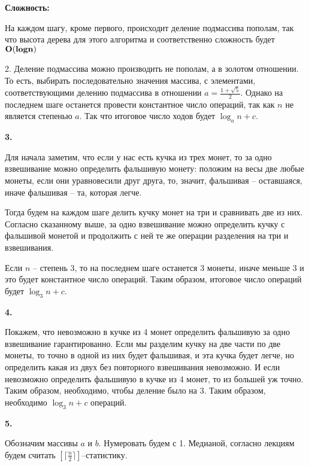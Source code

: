 \documentclass[12pt]{extreport}
\begin{document}
\bigskip 
{\bf Сложность:} 

На каждом шагу, кроме первого, происходит деление подмассива пополам, так что высота дерева для этого алгоритма и соответственно сложность будет $\bf{O(log n)}$

\bigskip 

2. Деление подмассива можно производить не пополам, а в золотом отношении. То есть, выбирать последовательно значения массива, с элементами, соответствующими делению подмассива в отношении $a=\frac{1 + \sqrt{5}}{2}$. Однако на последнем шаге останется провести константное число операций, так как $n$ не является степенью $a$. Так что итоговое число ходов будет $\log_{a}{n} + c$.

\bigskip 

{\bf 3.} 

Для начала заметим, что если у нас есть кучка из трех монет, то за одно взвешивание можно определить фальшивую монету: положим на весы две любые монеты, если они уравновесили друг друга, то, значит, фальшивая -- оставшаяся, иначе фальшивая -- та, которая легче. 

Тогда будем на каждом шаге делить кучку монет на три и сравнивать две из них. Согласно сказанному выше, за одно взвешивание можно определить кучку с фальшивой монетой и продолжить с ней те же операции разделения на три и взвешивания. 

Если $n$ -- степень 3, то на последнем шаге останется 3 монеты, иначе меньше 3 и это будет константное число операций. Таким образом, итоговое число операций будет $\log_3{n} + c$.

\bigskip 

{\bf 4.} 

Покажем, что невозможно в кучке из 4 монет определить фальшивую за одно взвешивание гарантированно. Если мы разделим кучку на две части по две монеты, то точно в одной из них будет фальшивая, и эта кучка будет легче, но определить какая из двух без повторного взвешивания невозможно. И если невозможно определить фальшивую в кучке из 4 монет, то из большей уж точно. Таким образом, необходимо, чтобы деление было на 3. Таким образом, необходимо $\log_3{n} + c$ операций.

\bigskip 

{\bf 5.} 

Обозначим массивы $a$ и $b$. Нумеровать будем с 1. Медианой, согласно лекциям будем считать $[\lceil \frac{n}{2}\rceil ]$--статистику.
\end{document}
